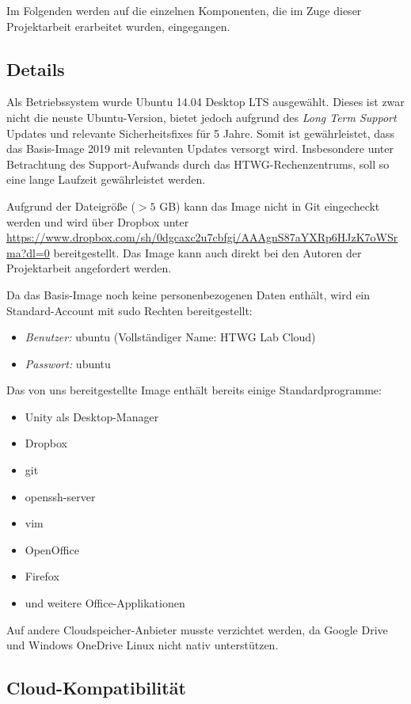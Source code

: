 Im Folgenden werden auf die einzelnen Komponenten, die im Zuge dieser Projektarbeit erarbeitet wurden, eingegangen.

\subsection{Details}

Als Betriebssystem wurde Ubuntu 14.04 Desktop LTS ausgewählt. 
Dieses ist zwar nicht die neuste Ubuntu-Version, bietet jedoch aufgrund des \emph{Long Term Support} Updates und relevante Sicherheitsfixes für 5 Jahre. 
Somit ist gewährleistet, dass das Basis-Image 2019 mit relevanten Updates versorgt wird. 
Insbesondere unter Betrachtung des Support-Aufwands durch das HTWG-Rechenzentrums, soll so eine lange Laufzeit gewährleistet werden.

Aufgrund der Dateigröße ($> 5$ GB) kann das Image nicht in Git eingecheckt werden und wird über Dropbox unter \url{https://www.dropbox.com/sh/0dgcaxc2u7cbfgi/AAAgnS87aYXRp6HJzK7oWSrma?dl=0} bereitgestellt. Das Image kann auch direkt bei den Autoren der Projektarbeit angefordert werden.

Da das Basis-Image noch keine personenbezogenen Daten enthält, wird ein Standard-Account mit sudo Rechten bereitgestellt:

\begin{itemize}
\item \emph{Benutzer:} ubuntu (Vollständiger Name: HTWG Lab Cloud)
\item \emph{Passwort:} ubuntu
\end{itemize}

Das von uns bereitgestellte Image enthält bereits einige Standardprogramme:

\begin{itemize}
\item Unity als Desktop-Manager
\item Dropbox
\item git
\item openssh-server
\item vim
\item OpenOffice
\item Firefox
\item und weitere Office-Applikationen
\end{itemize}

Auf andere Cloudspeicher-Anbieter musste verzichtet werden, da Google Drive und Windows OneDrive Linux nicht nativ unterstützen.

\subsection{Cloud-Kompatibilität}


